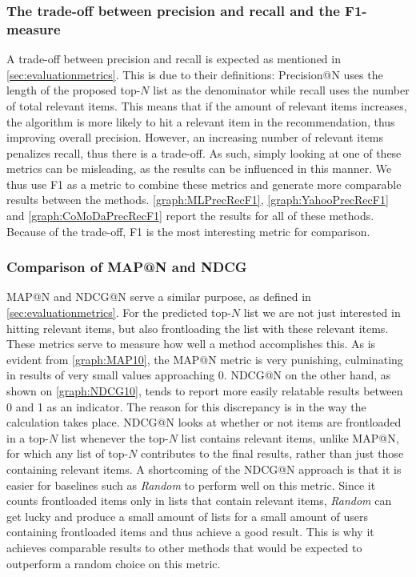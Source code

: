 \subsubsection{The trade-off between precision and recall and the F1-measure}\label{subsub:precrectradeoff}
A trade-off between precision and recall is expected as mentioned in \autoref{sec:evaluationmetrics}.
This is due to their definitions: Precision@N uses the length of the proposed top-$N$ list as the denominator while recall uses the number of total relevant items.
This means that if the amount of relevant items increases, the algorithm is more likely to hit a relevant item in the recommendation, thus improving overall precision.
However, an increasing number of relevant items penalizes recall, thus there is a trade-off.
As such, simply looking at one of these metrics can be misleading, as the results can be influenced in this manner.
We thus use F1 as a metric to combine these metrics and generate more comparable results between the methods.
\autoref{graph:MLPrecRecF1}, \autoref{graph:YahooPrecRecF1} and \autoref{graph:CoMoDaPrecRecF1} report the results for all of these methods.
Because of the trade-off, F1 is the most interesting metric for comparison.

\subsubsection{Comparison of MAP@N and NDCG}
MAP@N and NDCG@N serve a similar purpose, as defined in \autoref{sec:evaluationmetrics}.
For the predicted top-$N$ list we are not just interested in hitting relevant items, but also frontloading the list with these relevant items.
These metrics serve to measure how well a method accomplishes this.
As is evident from \autoref{graph:MAP10}, the MAP@N metric is very punishing, culminating in results of very small values approaching 0.
NDCG@N on the other hand, as shown on \autoref{graph:NDCG10}, tends to report more easily relatable results between 0 and 1 as an indicator.
The reason for this discrepancy is in the way the calculation takes place.
NDCG@N looks at whether or not items are frontloaded in a top-$N$ list whenever the top-$N$ list contains relevant items, unlike MAP@N, for which any list of top-$N$ contributes to the final results, rather than just those containing relevant items.
A shortcoming of the NDCG@N approach is that it is easier for baselines such as \textit{Random} to perform well on this metric.
Since it counts frontloaded items only in lists that contain relevant items, \textit{Random} can get lucky and produce a small amount of lists for a small amount of users containing frontloaded items and thus achieve a good result.
This is why it achieves comparable results to other methods that would be expected to outperform a random choice on this metric.

